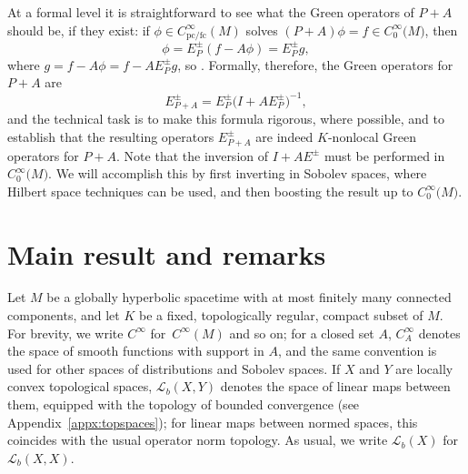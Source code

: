 \documentclass[11pt]{article}
\numberwithin{equation}{section}
\numberwithin{equation}{section}
\newcommand{\CoinX}[1]{C_0^\infty\big({#1}\big)}
\newcommand{\fc}{\mathrm{fc}}
\newcommand{\pc}{\mathrm{pc}}
\newcommand{\LL}{{\mathcal L}}
\begin{document}
 At a formal level it is straightforward to see what the Green operators of $P+A$ should be, if they exist: if
 $\phi\in C^\infty_{\pc/\fc}(M)$ solves $(P+A)\phi=f\in \CoinX{M}$, then
 \begin{equation*}
 	\phi = E_P^\pm (f- A\phi) = E^\pm_{P} g,
 \end{equation*}
 where $g=f - A \phi= f- AE_P^\pm g$, so . Formally, therefore, the Green operators for $P+A$ are
 \begin{equation}\label{eq:formalGF}
 	E_{P+A}^\pm = E_P^\pm \big(I+AE^\pm_{P}\big)^{-1},
 \end{equation}
 and the technical task is to make this formula rigorous, where possible, and to establish that the resulting operators $E_{P+A}^\pm$ are indeed $K$-nonlocal Green operators for $P+A$. Note that the inversion of $I+AE^\pm$ must be performed in $\CoinX{M}$. We will accomplish this by first inverting in Sobolev spaces, where Hilbert space techniques can be used, and then boosting the result up to $\CoinX{M}$.


 \section{Main result and remarks}\label{sec:main}

 Let $M$ be a globally hyperbolic spacetime with at most finitely many connected components,
 and let $K$ be a fixed, topologically regular, compact subset of $M$. For brevity, we write $C^\infty$ for~$C^\infty(M)$ and so on; for a closed set $A$, $C^\infty_A$ denotes the space of smooth functions with support in $A$, and the same convention is used for other spaces of distributions and Sobolev spaces. If $X$ and $Y$ are locally convex topological spaces, $\LL_b(X,Y)$ denotes the space of linear maps between them, equipped with the topology of bounded convergence (see Appendix~\ref{appx:topspaces}); for linear maps between normed spaces, this coincides with the usual operator norm topology. As usual, we write $\LL_b(X)$ for $\LL_b(X,X)$.
\end{document}
